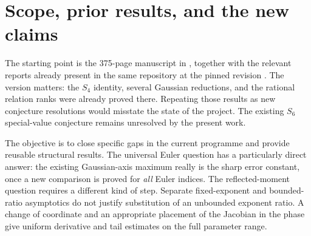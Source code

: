 \maketitle
\begin{abstract}
We continue the polylogarithm manuscript at the pinned repository revision
identified in Appendix~\ref{app:provenance}. Four proof developments are obtained. First, an elementary
multiplicative-increment inequality controls every Gaussian Euler remainder
at arbitrary positive real orders. It identifies the least universal
constant as $C_*=\max_{b>0}\{\beta(b)+2^{-b}\eta(b)\}$, and exact rational
certificates enclose its unique maximizer and its value. Second, the
coordinate $y=\log\Gamma(x)$ gives an all-orders expansion of reflected
log-gamma moments uniformly for every ratio of their two nonnegative
exponents, as the larger exponent tends to infinity. Third, an explicit
Appell-root separation bound and a logarithmic variation estimate for
the Lerch kernel yield an effective saturation threshold and simultaneous
zero locations when the Laurent index grows with the derivative order.
Fourth, a central-factorial identity integrally diagonalizes the odd-weight
shuffle minor, giving its cokernel, Smith factors, field ranks, and optimal
common inverse denominator. Weight-eleven and weight-thirteen Gaussian
relations are recorded as conjectures with exact finite proximity
certificates. Established source results, new proofs, finite certificates,
numerical diagnostics, and unresolved claims are distinguished throughout.
\end{abstract}

\tableofcontents
\clearpage

\section{Scope, prior results, and the new claims}
\label{sec:introduction}

The starting point is the 375-page manuscript in
, together with the relevant
reports already present in the same repository at the pinned revision
\cite{repo}. The version matters: the $S_4$ identity, several Gaussian
reductions, and the rational relation ranks were already proved there.
Repeating those results as new conjecture resolutions would misstate the
state of the project. The existing $S_6$ special-value conjecture remains
unresolved by the present work.

The objective is to close specific gaps in the current programme and
provide reusable structural results. The universal Euler question has a
particularly direct answer: the existing Gaussian-axis maximum really is
the sharp error constant, once a new comparison is proved for \emph{all}
Euler indices. The reflected-moment question requires a different kind of
step. Separate fixed-exponent and bounded-ratio asymptotics do not justify
substitution of an unbounded exponent ratio. A change of coordinate and
an appropriate placement of the Jacobian in the phase give uniform
derivative and tail estimates on the full parameter range.

